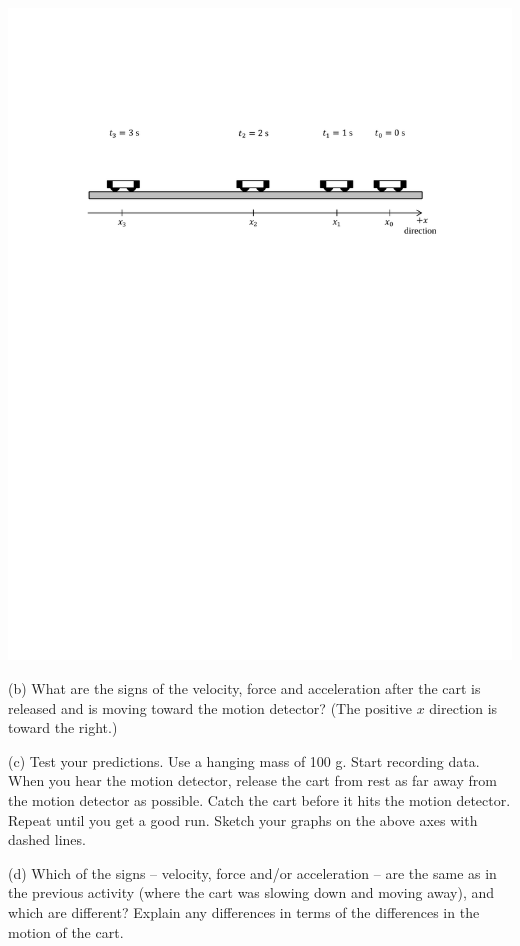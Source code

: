 \vspace{0.3cm}
{\par\centering \includegraphics{force2/carts_speeding.pdf} \par}

\pagebreak[3]
(b) What are the signs of the velocity, force and acceleration after the cart
is released and is moving toward the motion detector? (The positive $x$ direction
is toward the right.)
\answerspace{20mm}

(c) Test your predictions. Use a hanging mass of 100 g. Start recording data.
When you hear the motion detector, release the cart from rest as far away from
the motion detector as possible. Catch the cart before it hits the motion detector.
Repeat until you get a good run. Sketch your graphs on the above axes with dashed
lines.

(d) Which of the signs -- velocity, force and/or acceleration -- are the same as
in the previous activity (where the cart was slowing down and moving away), and
which are different? Explain any differences in terms of the differences in
the motion of the cart.
\answerspace{20mm}


